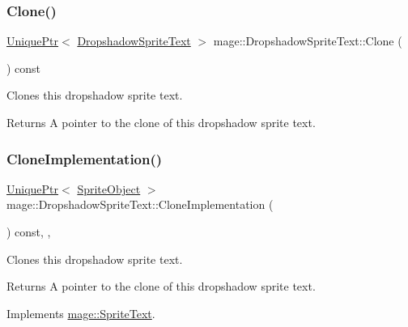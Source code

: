 \subsubsection{\texorpdfstring{Clone()}{Clone()}}
{\footnotesize\ttfamily \hyperlink{namespacemage_a8c307fbcc33bce9b7f2aa4c26c3b95cf}{Unique\+Ptr}$<$ \hyperlink{classmage_1_1_dropshadow_sprite_text}{Dropshadow\+Sprite\+Text} $>$ mage\+::\+Dropshadow\+Sprite\+Text\+::\+Clone (\begin{DoxyParamCaption}{ }\end{DoxyParamCaption}) const}

Clones this dropshadow sprite text.

\begin{DoxyReturn}{Returns}
A pointer to the clone of this dropshadow sprite text. 
\end{DoxyReturn}
\hypertarget{classmage_1_1_dropshadow_sprite_text_ae4b94b4120a9cae6bae11b61e7aed39b}{}\label{classmage_1_1_dropshadow_sprite_text_ae4b94b4120a9cae6bae11b61e7aed39b} 
\subsubsection{\texorpdfstring{Clone\+Implementation()}{CloneImplementation()}}
{\footnotesize\ttfamily \hyperlink{namespacemage_a8c307fbcc33bce9b7f2aa4c26c3b95cf}{Unique\+Ptr}$<$ \hyperlink{classmage_1_1_sprite_object}{Sprite\+Object} $>$ mage\+::\+Dropshadow\+Sprite\+Text\+::\+Clone\+Implementation (\begin{DoxyParamCaption}{ }\end{DoxyParamCaption}) const\hspace{0.3cm}{\ttfamily [override]}, {\ttfamily [private]}, {\ttfamily [virtual]}}

Clones this dropshadow sprite text.

\begin{DoxyReturn}{Returns}
A pointer to the clone of this dropshadow sprite text. 
\end{DoxyReturn}


Implements \hyperlink{classmage_1_1_sprite_text_a2b9f59a1730f8b9691f173251a2b4944}{mage\+::\+Sprite\+Text}.

\hypertarget{classmage_1_1_dropshadow_sprite_text_af76422c9812d7dc38e9b98e587103c67}{}\label{classmage_1_1_dropshadow_sprite_text_af76422c9812d7dc38e9b98e587103c67} 
